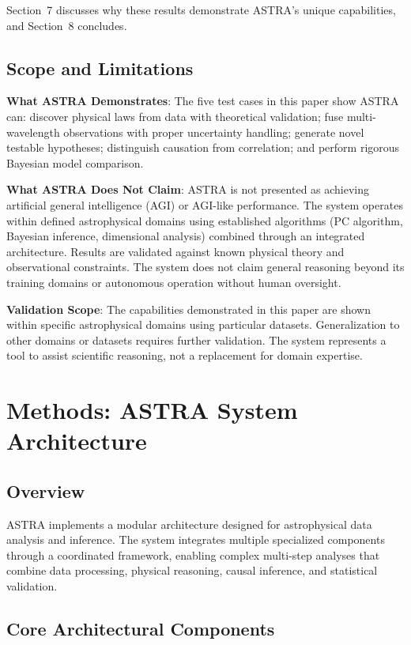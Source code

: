 \documentclass[usenatbib]{rasti}
\begin{document}
Section~7 discusses why these results demonstrate ASTRA's unique capabilities, and Section~8 concludes.

\subsection{Scope and Limitations}

\textbf{What ASTRA Demonstrates}: The five test cases in this paper show ASTRA can: discover physical laws from data with theoretical validation; fuse multi-wavelength observations with proper uncertainty handling; generate novel testable hypotheses; distinguish causation from correlation; and perform rigorous Bayesian model comparison.

\textbf{What ASTRA Does Not Claim}: ASTRA is not presented as achieving artificial general intelligence (AGI) or AGI-like performance. The system operates within defined astrophysical domains using established algorithms (PC algorithm, Bayesian inference, dimensional analysis) combined through an integrated architecture. Results are validated against known physical theory and observational constraints. The system does not claim general reasoning beyond its training domains or autonomous operation without human oversight.

\textbf{Validation Scope}: The capabilities demonstrated in this paper are shown within specific astrophysical domains using particular datasets. Generalization to other domains or datasets requires further validation. The system represents a tool to assist scientific reasoning, not a replacement for domain expertise.

\section{Methods: ASTRA System Architecture}

\subsection{Overview}

ASTRA implements a modular architecture designed for astrophysical data analysis and inference. The system integrates multiple specialized components through a coordinated framework, enabling complex multi-step analyses that combine data processing, physical reasoning, causal inference, and statistical validation.

\subsection{Core Architectural Components}
\end{document}

